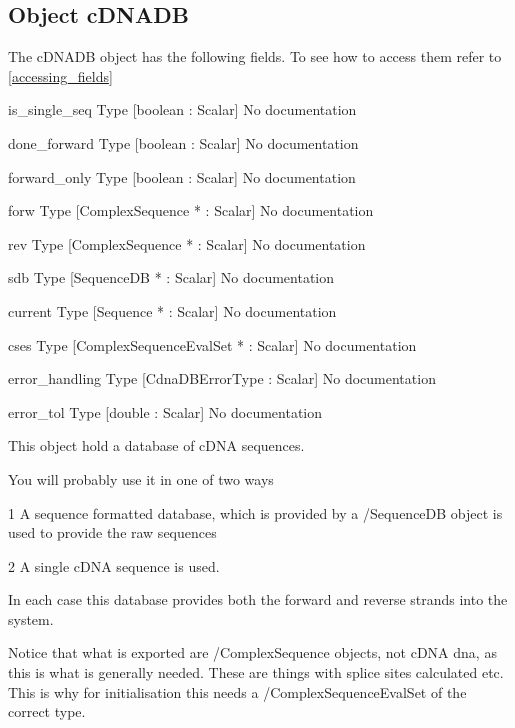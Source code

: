 \subsection{Object cDNADB}

\label{object_cDNADB}

The cDNADB object has the following fields. To see how to access them refer to \ref{accessing_fields}
\begin{description}
\item{is_single_seq} Type [boolean : Scalar] No documentation

\item{done_forward} Type [boolean : Scalar] No documentation

\item{forward_only} Type [boolean : Scalar] No documentation

\item{forw} Type [ComplexSequence * : Scalar] No documentation

\item{rev} Type [ComplexSequence * : Scalar] No documentation

\item{sdb} Type [SequenceDB * : Scalar] No documentation

\item{current} Type [Sequence * : Scalar] No documentation

\item{cses} Type [ComplexSequenceEvalSet * : Scalar] No documentation

\item{error_handling} Type [CdnaDBErrorType : Scalar] No documentation

\item{error_tol} Type [double : Scalar] No documentation

\end{description}
This object hold a database of
cDNA sequences.


You will probably use it in one of
two ways


1 A sequence formatted database, which
is provided by a /SequenceDB object
is used to provide the raw sequences 


2 A single cDNA sequence is used.


In each case this database provides
both the forward and reverse strands
into the system.


Notice that what is exported are
/ComplexSequence objects, not cDNA dna,
as this is what is generally needed. 
These are things with splice sites calculated
etc. This is why for initialisation this needs
a /ComplexSequenceEvalSet of the correct type.




